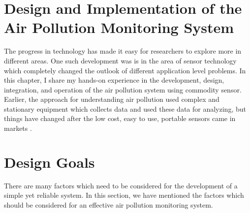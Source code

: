 \documentclass[12pt,a4paper,oneside]{report}
\begin{document}
\section*{Design and Implementation of the Air Pollution Monitoring System}

The progress in technology has made it easy for researchers to explore more in different areas. One such development was is in the area of sensor technology which completely changed the outlook of different application level problems. In this chapter, I share my hands-on experience in the development, design, integration, and operation of the air pollution system using commodity sensor. Earlier, the approach for understanding air pollution used complex and stationary equipment which collects data and used these data for analyzing, but things have changed after the low cost, easy to use, portable sensors came in markets \cite{Snyder2013}. 

\section*{Design Goals}

There are many factors which need to be considered for the development of a simple yet reliable system. In this section, we have mentioned the factors which should be considered for an effective air pollution monitoring system.
\end{document}
